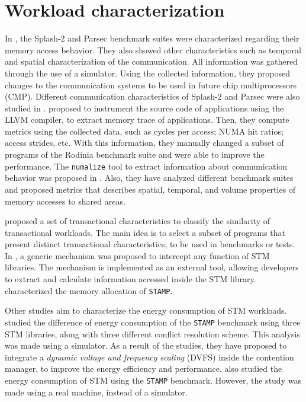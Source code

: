 \section{Workload characterization}\label{sect:charactRelated}

In , the Splash-2 and Parsec benchmark suites were characterized regarding their memory access behavior. They also showed other characteristics such as temporal and spatial characterization of the communication. All information was gathered through the use of a simulator. Using the collected information, they proposed changes to the communication systems to be used in future chip multiprocessors (CMP). Different communication characteristics of Splash-2 and Parsec were also studied in \cite{Mohammed:2015}.  proposed to instrument the source code of applications using the LLVM compiler, to extract memory trace of applications. Then, they compute metrics using the collected data, such as cycles per access; NUMA hit ratios; access strides, etc. With this information, they manually changed a subset of programs of the Rodinia benchmark suite and were able to improve the performance. The  \texttt{numalize} tool to extract information about communication behavior was proposed in \cite{Diener2015}. Also, they have analyzed different benchmark suites and proposed metrics that describes spatial, temporal, and volume properties of memory accesses to shared areas.

 proposed a set of transactional characteristics to classify the similarity of transactional workloads. The main idea is to select a subset of programs that present distinct transactional characteristics, to be used in benchmarks or tests. In \cite{Castro:2011}, a generic mechanism was proposed to intercept any function of STM libraries. The mechanism is implemented as an external tool, allowing developers to extract and calculate information accessed inside the STM library.  characterized the memory allocation of \texttt{STAMP}.

Other studies aim to characterize the energy consumption of STM workloads.  studied the difference of energy consumption of the \texttt{STAMP} benchmark using three STM libraries, along with three different conflict resolution scheme.  This analysis was made using a simulator. As a result of the studies, they have proposed to integrate a \emph{dynamic voltage and frequency scaling} (DVFS) inside the contention manager, to improve the energy efficiency and performance.  also studied the energy consumption of STM using the \texttt{STAMP} benchmark. However, the study was made using a real machine, instead of a simulator.

